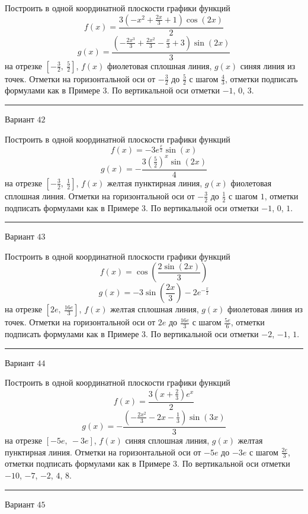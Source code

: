 \documentclass[11pt]{report}
\begin{document}
Построить в одной координатной плоскости графики функций $$f(x) = \frac{3 \left(- x^{2} + \frac{2 x}{3} + 1\right) \cos{\left(2 x \right)}}{2}$$ $$g(x) = \frac{\left(- \frac{2 x^{3}}{3} + \frac{2 x^{2}}{3} - \frac{x}{3} + 3\right) \sin{\left(2 x \right)}}{3}$$ на отрезке $\left[- \frac{3}{2}, \  \frac{5}{2}\right]$, $f(x)$ фиолетовая сплошная линия, $g(x)$ синяя линия из точек. Отметки на горизонтальной оси от $- \frac{3}{2}$ до $\frac{5}{2}$ с шагом $\frac{4}{3}$, отметки подписать формулами как в Примере 3. По вертикальной оси отметки $-1$, $0$, $3$.
\begin{center}
\noindent\rule{8cm}{0.4pt}
\end{center}
Вариант $42$


Построить в одной координатной плоскости графики функций $$f(x) = - 3 e^{\frac{x}{2}} \sin{\left(x \right)}$$ $$g(x) = - \frac{3 \left(\frac{5}{2}\right)^{x} \sin{\left(2 x \right)}}{4}$$ на отрезке $\left[- \frac{3}{2}, \  \frac{1}{2}\right]$, $f(x)$ желтая пунктирная линия, $g(x)$ фиолетовая сплошная линия. Отметки на горизонтальной оси от $- \frac{3}{2}$ до $\frac{1}{2}$ с шагом $1$, отметки подписать формулами как в Примере 3. По вертикальной оси отметки $-1$, $0$, $1$.
\begin{center}
\noindent\rule{8cm}{0.4pt}
\end{center}
Вариант $43$


Построить в одной координатной плоскости графики функций $$f(x) = \cos{\left(\frac{2 \sin{\left(2 x \right)}}{3} \right)}$$ $$g(x) = - 3 \sin{\left(\frac{2 x}{3} \right)} - 2 e^{- \frac{x}{2}}$$ на отрезке $\left[2 e, \  \frac{16 e}{3}\right]$, $f(x)$ желтая сплошная линия, $g(x)$ фиолетовая линия из точек. Отметки на горизонтальной оси от $2 e$ до $\frac{16 e}{3}$ с шагом $\frac{5 e}{6}$, отметки подписать формулами как в Примере 3. По вертикальной оси отметки $-2$, $-1$, $1$.
\begin{center}
\noindent\rule{8cm}{0.4pt}
\end{center}
Вариант $44$


Построить в одной координатной плоскости графики функций $$f(x) = \frac{3 \left(x + \frac{2}{3}\right) e^{x}}{2}$$ $$g(x) = - \frac{\left(- \frac{2 x^{2}}{3} - 2 x - \frac{1}{3}\right) \sin{\left(3 x \right)}}{3}$$ на отрезке $\left[- 5 e, \  - 3 e\right]$, $f(x)$ синяя сплошная линия, $g(x)$ желтая пунктирная линия. Отметки на горизонтальной оси от $- 5 e$ до $- 3 e$ с шагом $\frac{2 e}{3}$, отметки подписать формулами как в Примере 3. По вертикальной оси отметки $-10$, $-7$, $-2$, $4$, $8$.
\begin{center}
\noindent\rule{8cm}{0.4pt}
\end{center}
Вариант $45$
\end{document}
